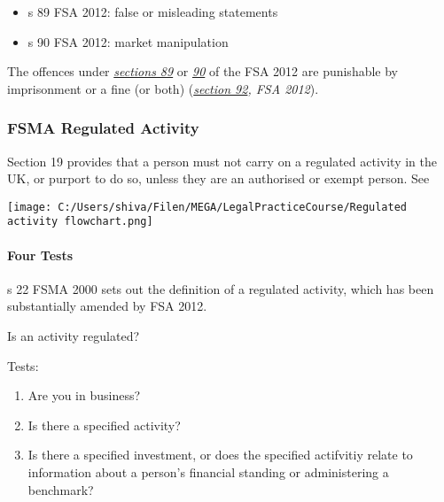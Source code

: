 \documentclass[
]{article}
\providecommand{\tightlist}{%
  \setlength{\itemsep}{0pt}\setlength{\parskip}{0pt}}
\newenvironment{env-e13e9fd0-5f1d-4d3b-a773-c52df1c9cab0}
{
    \savenotes\tcolorbox[blanker,breakable,left=5pt,borderline west={2pt}{-4pt}{pink}]
}
{
    \endtcolorbox\spewnotes
}
\begin{document}
\begin{itemize}
\tightlist
\item
  s 89 FSA 2012: false or misleading statements
\item
  s 90 FSA 2012: market manipulation
\end{itemize}

The offences under
\emph{\href{https://uk.westlaw.com/7-523-3717?originationContext=document\&transitionType=PLDocumentLink\&contextData=(sc.Default)\&ppcid=287b073fbf064422aba9bab6fbc11f1d}{sections
89}} or
\emph{\href{https://uk.westlaw.com/5-523-3718?originationContext=document\&transitionType=PLDocumentLink\&contextData=(sc.Default)\&ppcid=287b073fbf064422aba9bab6fbc11f1d}{90}}
of the FSA 2012 are punishable by imprisonment or a fine (or both)
(\emph{\href{https://uk.westlaw.com/1-523-3720?originationContext=document\&transitionType=PLDocumentLink\&contextData=(sc.Default)\&ppcid=287b073fbf064422aba9bab6fbc11f1d}{section
92}, FSA 2012}).

\hypertarget{fsma-regulated-activity}{%
\subsubsection{FSMA Regulated Activity}\label{fsma-regulated-activity}}

Section 19 provides that a person must not carry on a regulated activity
in the UK, or purport to do so, unless they are an authorised or exempt
person. See

\texttt{[image: C:/Users/shiva/Filen/MEGA/LegalPracticeCourse/Regulated activity flowchart.png]}

\hypertarget{four-tests}{%
\paragraph{Four Tests}\label{four-tests}}

s 22 FSMA 2000 sets out the definition of a regulated activity, which
has been substantially amended by FSA 2012.

\begin{env-e13e9fd0-5f1d-4d3b-a773-c52df1c9cab0}

Is an activity regulated?

Tests:

\begin{enumerate}
\tightlist
\item
  Are you in business?
\item
  Is there a specified activity?
\item
  Is there a specified investment, or does the specified actifvitiy
  relate to information about a person's financial standing or
  administering a benchmark?
\end{enumerate}

\end{env-e13e9fd0-5f1d-4d3b-a773-c52df1c9cab0}
\end{document}
